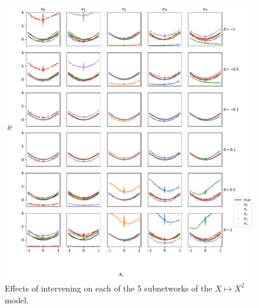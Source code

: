 \documentclass{article}
\theoremstyle{plain}
\theoremstyle{definition}
\theoremstyle{remark}
\begin{document}
\begin{figure}[ht]
    \centerline{\includegraphics[width=\textwidth]{../figures/s7_squared_intervention_more_deltas.pdf}}
    \centering
    \caption{Effects of intervening on each of the 5 subnetworks of the $X \mapsto X^2$ model.}\label{fig:s7_squared_intervention_more_deltas}
\end{figure}
\end{document}
